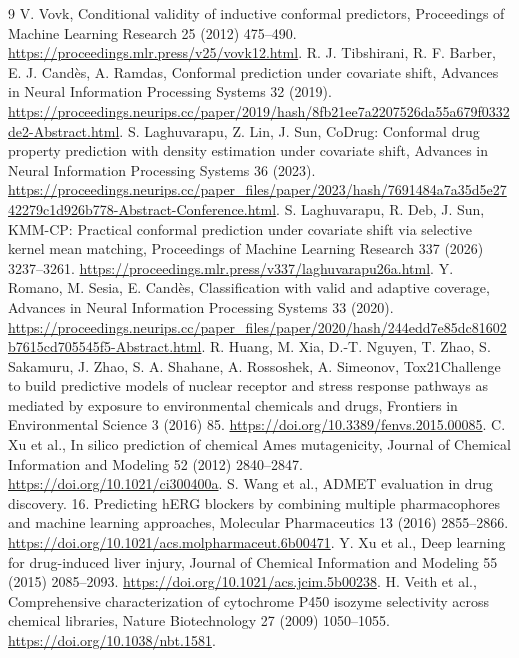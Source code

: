 \documentclass[11pt]{article}
\begin{document}
\begin{thebibliography}{9}
 V. Vovk, Conditional validity of inductive conformal predictors, Proceedings of Machine Learning Research 25 (2012) 475--490. \url{https://proceedings.mlr.press/v25/vovk12.html}.
 R. J. Tibshirani, R. F. Barber, E. J. Cand\`es, A. Ramdas, Conformal prediction under covariate shift, Advances in Neural Information Processing Systems 32 (2019). \url{https://proceedings.neurips.cc/paper/2019/hash/8fb21ee7a2207526da55a679f0332de2-Abstract.html}.
 S. Laghuvarapu, Z. Lin, J. Sun, CoDrug: Conformal drug property prediction with density estimation under covariate shift, Advances in Neural Information Processing Systems 36 (2023). \url{https://proceedings.neurips.cc/paper_files/paper/2023/hash/7691484a7a35d5e2742279c1d926b778-Abstract-Conference.html}.
 S. Laghuvarapu, R. Deb, J. Sun, KMM-CP: Practical conformal prediction under covariate shift via selective kernel mean matching, Proceedings of Machine Learning Research 337 (2026) 3237--3261. \url{https://proceedings.mlr.press/v337/laghuvarapu26a.html}.
 Y. Romano, M. Sesia, E. Cand\`es, Classification with valid and adaptive coverage, Advances in Neural Information Processing Systems 33 (2020). \url{https://proceedings.neurips.cc/paper_files/paper/2020/hash/244edd7e85dc81602b7615cd705545f5-Abstract.html}.
 R. Huang, M. Xia, D.-T. Nguyen, T. Zhao, S. Sakamuru, J. Zhao, S. A. Shahane, A. Rossoshek, A. Simeonov, Tox21Challenge to build predictive models of nuclear receptor and stress response pathways as mediated by exposure to environmental chemicals and drugs, Frontiers in Environmental Science 3 (2016) 85. \url{https://doi.org/10.3389/fenvs.2015.00085}.
 C. Xu et al., In silico prediction of chemical Ames mutagenicity, Journal of Chemical Information and Modeling 52 (2012) 2840--2847. \url{https://doi.org/10.1021/ci300400a}.
 S. Wang et al., ADMET evaluation in drug discovery. 16. Predicting hERG blockers by combining multiple pharmacophores and machine learning approaches, Molecular Pharmaceutics 13 (2016) 2855--2866. \url{https://doi.org/10.1021/acs.molpharmaceut.6b00471}.
 Y. Xu et al., Deep learning for drug-induced liver injury, Journal of Chemical Information and Modeling 55 (2015) 2085--2093. \url{https://doi.org/10.1021/acs.jcim.5b00238}.
 H. Veith et al., Comprehensive characterization of cytochrome P450 isozyme selectivity across chemical libraries, Nature Biotechnology 27 (2009) 1050--1055. \url{https://doi.org/10.1038/nbt.1581}.
\end{thebibliography}
\end{document}
